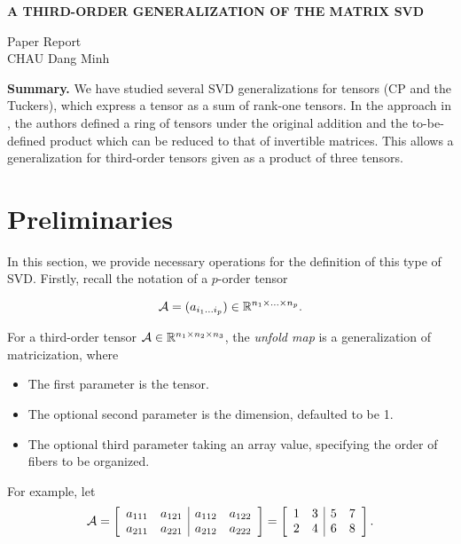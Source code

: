 \begin{center}
    \textbf{\Large A THIRD-ORDER GENERALIZATION OF THE MATRIX SVD} \\
    \vspace{0.5cm}

    Paper Report \\
    CHAU Dang Minh
\end{center}

\begin{center}
    \begin{minipage}{0.85\textwidth}
        \textbf{Summary.} We have studied several SVD generalizations for tensors (CP and the Tuckers), which express a tensor as a sum of rank-one tensors. In the approach in \cite{kilmer2008third}, the authors defined a ring of tensors under the original addition and the to-be-defined product which can be reduced to that of invertible matrices. This allows a generalization for third-order tensors given as a product of three tensors.
    \end{minipage}
\end{center}

\section{Preliminaries}
In this section, we provide necessary operations for the definition of this type of SVD. Firstly, recall the notation of a $p$-order tensor

\begin{equation}
    \mathcal{A} = (a_{i_1\ldots i_p})\in{\mathbb{R}}^{n_1\times\ldots\times n_p}.
\end{equation}

For a third-order tensor $\mathcal{A}\in{\mathbb{R}}^{n_1\times n_2\times n_3}$, the \textit{unfold map} is a generalization of matricization, where

\begin{itemize}
    \item The first parameter is the tensor.
    \item The optional second parameter is the dimension, defaulted to be 1.
    \item The optional third parameter taking an array value, specifying the order of fibers to be organized.
\end{itemize}

For example, let
$$\mathcal{A} = \left[\begin{array}{cc|cc}
            a_{111} & a_{121} & a_{112} & a_{122} \\
            a_{211} & a_{221} & a_{212} & a_{222}
        \end{array}\right] = \left[\begin{array}{cc|cc}
            1 & 3 & 5 & 7 \\
            2 & 4 & 6 & 8
        \end{array}\right].$$

